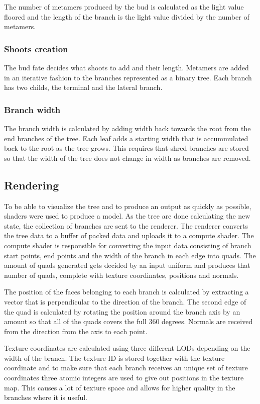 \documentclass[11pt]{article} %
\begin{document}
The number of metamers produced by the bud is calculated as the light value floored and the length of the branch is the light value divided by the number of metamers.

\subsubsection{Shoots creation}
The bud fate decides what shoots to add and their length.
Metamers are added in an iterative fashion to the branches represented as a binary tree.
Each branch has two childs, the terminal and the lateral branch.

\subsubsection{Branch width}
The branch width is calculated by adding width back towards the root from the end branches of the tree.
Each leaf adds a starting width that is accummulated back to the root as the tree grows.
This requires that shred branches are stored so that the width of the tree does not change in width as branches are removed.

\subsection{Rendering}
To be able to visualize the tree and to produce an output as quickly as possible, shaders were used to produce a model.
As the tree are done calculating the new state, the collection of branches are sent to the renderer.
The renderer converts the tree data to a buffer of packed data and uploads it to a compute shader.
The compute shader is responsible for converting the input data consisting of branch start points, end points and the width of the branch in each edge into quads.
The amount of quads generated gets decided by an input uniform and produces that number of quads, complete with texture coordinates, positions and normals.

The position of the faces belonging to each branch is calculated by extracting a vector that is perpendicular to the direction of the branch.
The second edge of the quad is calculated by rotating the position around the branch axis by an amount so that all of the quads covers the full 360 degrees.
Normals are received from the direction from the axis to each point.

Texture coordinates are calculated using three different LODs depending on the width of the branch.
The texture ID is stored together with the texture coordinate and to make sure that each branch receives an unique set of texture coordinates three atomic integers are used to give out positions in the texture map.
This causes a lot of texture space and allows for higher quality in the branches where it is useful.
\end{document}
